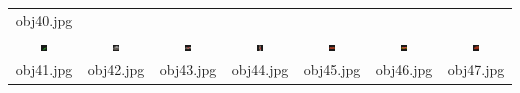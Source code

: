 \begin{table}[H]
\begin{tabu}{|ccccccc|}
    \scriptsize{obj40.jpg}
    \\
    \includegraphics[width=0.1\textwidth,height=0.1\textwidth]{imagens/coil_100/carrinhos_brinquedos/obj27__0_1.png} &
    \includegraphics[width=0.1\textwidth,height=0.1\textwidth]{imagens/coil_100/carrinhos_brinquedos/obj37__0.png} &
    \includegraphics[width=0.1\textwidth,height=0.1\textwidth]{imagens/coil_100/carrinhos_brinquedos/obj69__0.png} &
    \includegraphics[width=0.1\textwidth,height=0.1\textwidth]{imagens/coil_100/carrinhos_brinquedos/obj69__0_1.png} &
    \includegraphics[width=0.1\textwidth,height=0.1\textwidth]{imagens/coil_100/carrinhos_brinquedos/obj76__0.png} &
    \includegraphics[width=0.1\textwidth,height=0.1\textwidth]{imagens/coil_100/carrinhos_brinquedos/obj91__0.png} &
    \includegraphics[width=0.1\textwidth,height=0.1\textwidth]{imagens/coil_100/carrinhos_brinquedos/obj100__0.png}
    \\
    \scriptsize{obj41.jpg} & \scriptsize{obj42.jpg} & \scriptsize{obj43.jpg} &
    \scriptsize{obj44.jpg} & \scriptsize{obj45.jpg} & \scriptsize{obj46.jpg} &
    \scriptsize{obj47.jpg}
  \end{tabu}
\end{table}

